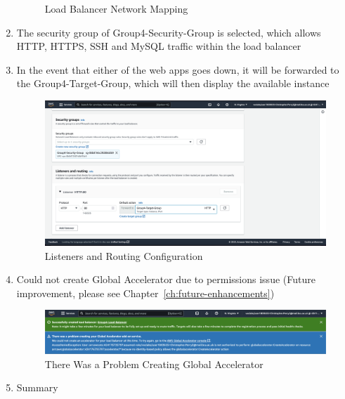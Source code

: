 \begin{enumerate}
\begin{figure}[H]
	      \caption{Load Balancer Network Mapping}
	      \label{fig:elb-networ-mapping}
	\end{figure}
	\item The security group of Group4-Security-Group is selected, which allows HTTP, HTTPS, SSH and MySQL traffic within
	      the load balancer
	\item In the event that either of the web apps goes down, it will be forwarded to the Group4-Target-Group, which will then
	      display the available instance \begin{figure}[H]
	      \centering
	      \includegraphics[width=\textwidth]{resources/elb/elb-security-groups-and-listeners.png}
	      \caption{Listeners and Routing Configuration}
	      \label{fig:elb-security-groups}
	\end{figure}
	\item Could not create Global Accelerator due to permissions issue (Future improvement, please see Chapter~\ref{ch:future-enhancements})
	      \begin{figure}[H]
	      	\centering
	      	\includegraphics[width=\textwidth]{resources/elb/elb-accelerator.png}
	      	\caption{There Was a Problem Creating Global Accelerator}
	      	\label{fig:elb-accelerators}
	      \end{figure}
	\pagebreak
	\item Summary


\end{enumerate}
